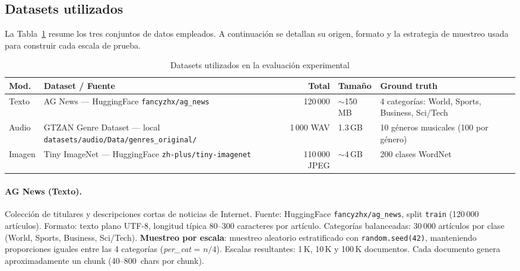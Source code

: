 \documentclass[12pt,a4paper]{article}
\begin{document}
\subsection{Datasets utilizados}

La Tabla~\ref{tab:datasets} resume los tres conjuntos de datos empleados.
A continuación se detallan su origen, formato y la estrategia de muestreo
usada para construir cada escala de prueba.

\begin{table}[H]
  \centering
  \caption{Datasets utilizados en la evaluación experimental}
  \label{tab:datasets}
  \begin{tabular}{lp{4.5cm}rp{2cm}p{3.5cm}}
    \toprule
    \textbf{Mod.} & \textbf{Dataset / Fuente} & \textbf{Total} & \textbf{Tamaño} & \textbf{Ground truth} \\
    \midrule
    Texto  & AG News — HuggingFace \texttt{fancyzhx/ag\_news}
           & 120\,000 & $\sim$150\,MB & 4 categorías: World, Sports, Business, Sci/Tech \\
    \midrule
    Audio  & GTZAN Genre Dataset — local \texttt{datasets/audio/Data/genres\_original/}
           & 1\,000 WAV & 1.3\,GB & 10 géneros musicales (100 por género) \\
    \midrule
    Imagen & Tiny ImageNet — HuggingFace \texttt{zh-plus/tiny-imagenet}
           & 110\,000 JPEG & $\sim$4\,GB & 200 clases WordNet \\
    \bottomrule
  \end{tabular}
\end{table}

\paragraph{AG News (Texto).}
Colección de titulares y descripciones cortas de noticias de Internet.
Fuente: HuggingFace \texttt{fancyzhx/ag\_news}, split \texttt{train} (120\,000 artículos).
Formato: texto plano UTF-8, longitud típica 80--300 caracteres por artículo.
Categorías balanceadas: 30\,000 artículos por clase
(World, Sports, Business, Sci/Tech).
\textbf{Muestreo por escala}: muestreo aleatorio estratificado con
\texttt{random.seed(42)}, manteniendo proporciones iguales entre las 4 categorías
(\textit{per\_cat} = $n/4$). Escalas resultantes: 1\,K, 10\,K y 100\,K documentos.
Cada documento genera aproximadamente un chunk (40--800~chars por chunk).
\end{document}
